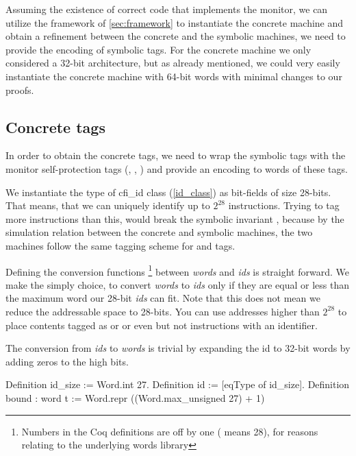 Assuming the existence of correct code that implements the \CFI
monitor, we can utilize the framework of \cref{sec:framework} to
instantiate the concrete machine and obtain a refinement between the
concrete and the symbolic machines, we need to provide the encoding of
symbolic tags. For the concrete machine we only considered a 32-bit
architecture, but as already mentioned, we could very easily
instantiate the concrete machine with 64-bit words with minimal
changes to our proofs.

\subsection{Concrete tags}\label{sec:concrete_tags}

In order to obtain the concrete tags, we need to wrap the symbolic
tags with the monitor self-protection tags (\USERname, \ENTRYname,
\MONITOR) and provide an encoding to words of these tags.

We instantiate the \id type of cfi\_id class (\cref{id_class}) as
bit-fields of size 28-bits. That means, that we can uniquely identify
up to $2^{28}$ instructions. Trying to tag more instructions than
this, would break the symbolic
invariant , because by the simulation
relation between the concrete and symbolic machines, the
two machines follow the same tagging scheme for \USERname and \ENTRYname tags.

Defining the conversion functions \footnote{Numbers in the Coq
  definitions are off by one ( means 28), for reasons relating
  to the underlying words library } between
\textit{words} and \textit{ids} is straight forward. We make the
simply choice, to convert \textit{words} to \textit{ids} only if they
are equal or less than the maximum word our 28-bit \textit{ids} can
fit. Note that this does not mean we reduce the addressable space to
28-bits. You can use addresses higher than $2^{28}$ to place contents
tagged as \DATAname or \MONITOR or even \INSTR{$\bot$} but not
instructions with an identifier.

The conversion from \textit{ids} to \textit{words} is trivial by
expanding the id to 32-bit words by adding zeros to the high bits.


Definition id_size := Word.int 27.
Definition id := [eqType of id_size].
Definition bound : word t := 
  Word.repr ((Word.max_unsigned 27) + 1)%


